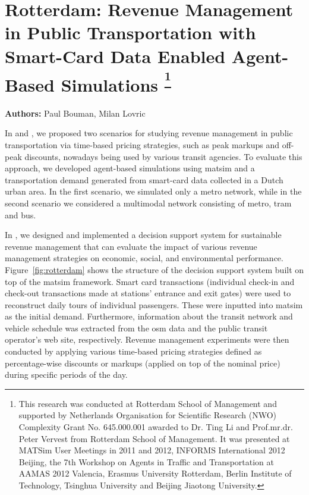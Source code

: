 \section{Rotterdam: Revenue Management in Public Transportation with Smart-Card Data Enabled Agent-Based Simulations \textsuperscript{\footnotesize{\footnote{This research was conducted at Rotterdam School of Management and
supported by Netherlands Organisation for Scientific Research (NWO)
Complexity Grant No. 645.000.001 awarded to Dr. Ting Li and Prof.mr.dr. Peter Vervest from
Rotterdam School of Management. It was presented at MATSim User Meetings in 2011 and 2012,
INFORMS International 2012 Beijing, the 7th Workshop on Agents in Traffic and Transportation at
AAMAS 2012 Valencia, Erasmus University Rotterdam, Berlin Institute of Technology, Tsinghua
University and Beijing Jiaotong University.}}}}
\label{sec:rotterdam}
\hfill \textbf{Authors:} Paul Bouman, Milan Lovric

In \citet[][]{LovricEtAl_DSS_2013} and \citet[][]{BoumanEtAl_AAMAS_2012}, we proposed two scenarios for studying revenue management in public transportation via time-based pricing strategies, such as peak markups and off-peak discounts, nowadays being used by various transit agencies. To evaluate this approach, we developed agent-based simulations using \gls{matsim} and a transportation demand generated from smart-card data collected in a Dutch urban area. In the first scenario, we simulated only a metro network, while in the second scenario we considered a \gls{multimodal} network consisting of metro, tram and bus.

In \citet[][]{LovricEtAl_DSS_2013}, we designed and implemented a decision support system for sustainable revenue management that can evaluate the impact of various revenue management strategies on economic, social, and environmental performance. Figure~\ref{fig:rotterdam} shows the structure of the decision support system built on top of the \gls{matsim} framework. Smart card transactions (individual check-in and check-out transactions made at stations' entrance and exit gates) were used to reconstruct daily tours of individual passengers. These were inputted into \gls{matsim} as the initial demand. Furthermore, information about the transit network and vehicle schedule was extracted from the \gls{osm} data and the public transit operator's web site, respectively. Revenue management experiments were then conducted by applying various time-based pricing strategies defined as percentage-wise discounts or markups (applied on top of the nominal price) during specific periods of the day. 

